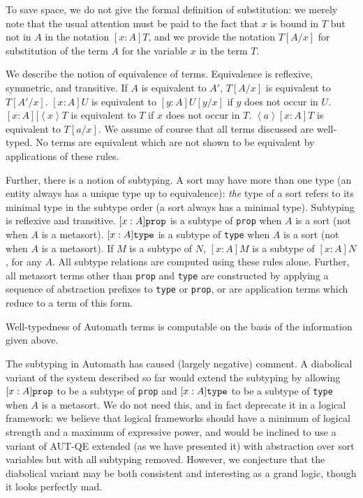 \documentclass{article}
\begin{document}
To save space, we do not give the formal definition of substitution:  we merely note that the usual attention must be paid to the fact that $x$ is bound in $T$ but not in $A$ in the notation $[x:A]T$, and we provide the notation $T[A/x]$ for substitution of the term $A$ for the variable $x$ in the term $T$.

We describe the notion of equivalence of terms.  Equivalence is reflexive, symmetric, and transitive.  If $A$ is equivalent to $A'$, $T[A/x]$ is equivalent to $T[A'/x]$.  $[x:A]U$ is equivalent to $[y:A]U[y/x]$ if $y$ does not occur in $U$.  $[x:A][\left<x\right>T$ is equivalent to $T$ if $x$ does not occur in $T$.
$\left<a\right>[x:A]T$ is equivalent to $T[a/x]$.  We assume of course that all terms discussed are well-typed.  No terms are equivalent which are not shown to be equivalent by applications of these rules.

Further, there is a notion of subtyping.  A sort may have more than one type (an entity always has a unique type up to equivalence):  {\em the\/} type of a sort refers to its minimal type in the subtype order (a sort always has a minimal type).  Subtyping is reflexive and transitive.  $[x:A]{\tt prop}$ is a subtype of {\tt prop} when $A$ is a sort (not when $A$ is a metasort).  $[x:A]{\tt type}$ is a subtype of {\tt type} when $A$ is a sort (not when $A$ is a metasort).  If $M$ is a subtype of $N$, $[x:A]M$ is a subtype of $[x:A]N$, for any $A$.  All subtype relations are computed using these rules alone.  Further, all metasort terms other than {\tt prop} and {\tt type} are constructed by applying a sequence of abstraction prefixes to
{\tt type} or {\tt prop}, or are application terms which reduce to a term of this form.

Well-typedness of Automath terms is computable on the basis of the information given above.

The subtyping in Automath has caused (largely negative) comment.  A diabolical variant of the system described so far would extend the subtyping by
allowing $[x:A]{\tt prop}$ to be a subtype of {\tt prop} and $[x:A]{\tt type}$ to be a subtype of {\tt type} when $A$ is a metasort.  We do not need this, and in fact deprecate it in a logical framework:  we believe that logical frameworks should have a minimum of logical strength and a maximum of expressive power, and would be inclined to use a variant of AUT-QE extended (as we have presented it) with abstraction over sort variables but with all subtyping removed.  However, we conjecture that the diabolical variant may be both consistent and interesting as a grand logic, though it looks perfectly mad.
\end{document}

